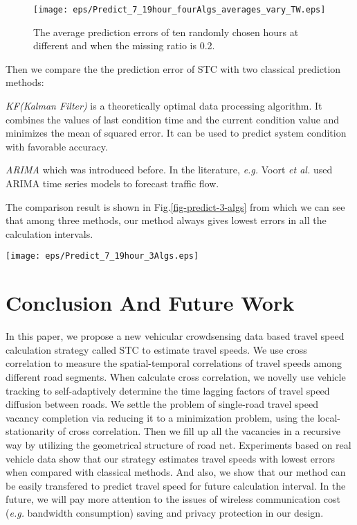 \documentclass[twocolumn,10pt,final,conference]{IEEEtran}
\def\etal{\textit{et al.}\xspace}
\def\eg{\textit{e.g.}\xspace}
\begin{document}
\begin{figure}[h]
  \centering
\texttt{[image: eps/Predict\_7\_19hour\_fourAlgs\_averages\_vary\_TW.eps]}\\
  \caption{The average prediction errors of ten randomly chosen hours at different  and  when the missing ratio is 0.2.}
  \label{fig-predict-difft-w-STC}
\end{figure}


Then we compare the the prediction error of STC with two  classical prediction methods:

\emph{KF(Kalman Filter)} is a theoretically optimal data processing algorithm\cite{Ref80}\cite{Ref92}\cite{Ref81}. It combines the values of last condition time and the current condition value and minimizes the mean of squared error. It can be used to predict system condition with favorable accuracy.

\emph{ARIMA} which was introduced before. In the literature, \eg Voort \etal \cite{Ref83} used ARIMA time series models to forecast traffic flow.

The comparison result is shown in Fig.\ref{fig-predict-3-algs} from which we can see that among three methods, our method always gives lowest errors in all the calculation intervals.
\begin{figure*}[t]
  \centering
\texttt{[image: eps/Predict\_7\_19hour\_3Algs.eps]}\\
  \caption{The prediction errors of STC, KF, and ARIMA. STC always gives the lowest errors among three methods.}
  \label{fig-predict-3-algs}
\end{figure*}



\section{Conclusion And Future Work}\label{section-Conclusion And Future Work}
In this paper, we propose a new vehicular crowdsensing data based travel speed calculation strategy called STC to estimate travel speeds. We use cross correlation to measure the spatial-temporal correlations of travel speeds among different road segments. When calculate cross correlation, we novelly use vehicle tracking to self-adaptively determine the time lagging factors of travel speed diffusion between roads. We settle the problem of single-road travel speed vacancy completion via reducing it to a minimization problem, using the local-stationarity of cross correlation. Then we fill up all the vacancies in a recursive way by utilizing the geometrical structure of road net. Experiments based on real vehicle data show that our strategy estimates travel speeds with lowest errors when compared with classical methods. And also, we show that our method can be easily transfered to predict travel speed for future calculation interval. In the future, we will pay more attention to the issues of wireless communication cost (\eg bandwidth consumption) saving and privacy protection in our design.





\end{document}
